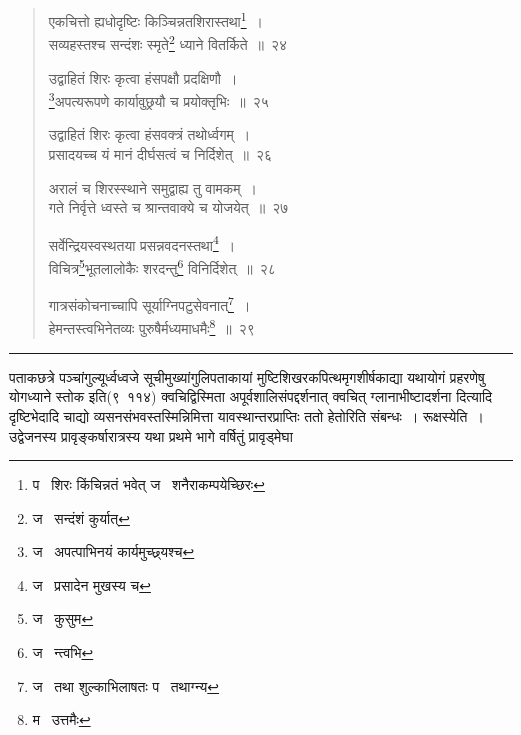 \documentclass[11pt, openany]{book}
\begin{document}
\begin{quote}
{\na एकचित्तो ह्यधोदृष्टिः किञ्चिन्नतशिरास्तथा\renewcommand{\thefootnote}{1}\footnote{प \textendash\  शिरः किंचिन्नतं भवेत् ज \textendash\  शनैराकम्पयेच्छिरः}~।\\
सव्यहस्तश्च सन्दंशः स्मृते\renewcommand{\thefootnote}{2}\footnote{ज \textendash\  सन्दंशं कुर्यात्} ध्याने वितर्किते~॥~२४

उद्वाहितं शिरः कृत्वा हंसपक्षौ प्रदक्षिणौ~।\\
\renewcommand{\thefootnote}{3}\footnote{ज \textendash\  अपत्पाभिनयं कार्यमुच्छ्र्यश्च}अपत्यरूपणे कार्यावुछ्रयौ च प्रयोक्तृभिः~॥~२५

उद्वाहितं शिरः कृत्वा हंसवक्त्रं तथोर्ध्वगम्~।\\
प्रसादयच्च यं मानं दीर्घसत्वं च निर्दिशेत्~॥~२६

अरालं च शिरस्स्थाने समुद्वाह्य तु वामकम्~।\\
गते निर्वृत्ते ध्वस्ते च श्रान्तवाक्ये च योजयेत्~॥~२७

सर्वेन्द्रियस्वस्थतया प्रसन्नवदनस्तथा\renewcommand{\thefootnote}{4}\footnote{ज \textendash\  प्रसादेन मुखस्य च}~।\\
विचित्र\renewcommand{\thefootnote}{5}\footnote{ज \textendash\  कुसुम}भूतलालोकैः शरदन्तु\renewcommand{\thefootnote}{6}\footnote{ज \textendash\  न्त्वभि} विनिर्दिशेत्~॥~२८

गात्रसंकोचनाच्चापि सूर्याग्निपटुसेवनात्\renewcommand{\thefootnote}{7}\footnote{ज \textendash\  तथा शुल्काभिलाषतः प \textendash\  तथाग्न्य}~।\\
हेमन्तस्त्वभिनेतव्यः पुरुषैर्मध्यमाधमैः\renewcommand{\thefootnote}{8}\footnote{म \textendash\  उत्तमैः}~॥~२९}
\end{quote}

\hrule

\vspace{2mm}
\noindent
पताकछत्रे पञ्चांगुल्यूर्ध्वध्वजे सूचीमुख्यांगुलिपताकायां मुष्टिशिखरकपित्थमृगशीर्षकाद्या यथायोगं प्रहरणेषु योगध्याने स्तोक इति(९\textendash\ ११४) क्वचिद्विस्मिता अपूर्वशालिसंपद्दर्शनात् क्वचित् {\qt ग्लानाभीष्टादर्शना} दित्यादि दृष्टिभेदादि चाद्यो व्यसनसंभवस्तस्मिन्निमित्ता यावस्थान्तरप्राप्तिः ततो हेतोरिति संबन्धः~। रूक्षस्येति~। उद्वेजनस्य प्रावृङ्कर्षारात्रस्य यथा प्रथमे भागे वर्षितुं प्रावृड्मेघा\textendash

\newpage
\end{document}
